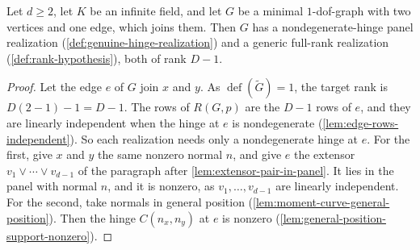\begin{lemma}
  \label{lem:theorem-55-base-producer-single}
  \leanok
  Let $d \ge 2$, let $K$ be an infinite field, and let $G$ be a minimal
  $1$-dof-graph with two vertices and one edge, which joins them. Then
  $G$ has a nondegenerate-hinge panel realization
  (\cref{def:genuine-hinge-realization}) and a generic full-rank
  realization (\cref{def:rank-hypothesis}), both of rank $D - 1$.
\end{lemma}
\begin{proof}
  \leanok
  Let the edge $e$ of $G$ join $x$ and $y$. As
  $\operatorname{def}(\tilde G) = 1$, the target rank is
  $D(2 - 1) - 1 = D - 1$. The rows of $R(G,p)$ are the $D - 1$ rows of
  $e$, and they are linearly independent when the hinge at $e$ is
  nondegenerate (\cref{lem:edge-rows-independent}). So each
  realization needs only a nondegenerate hinge at $e$. For the first,
  give $x$ and $y$ the same nonzero normal $n$, and give $e$ the extensor
  $v_1 \vee \cdots \vee v_{d-1}$ of the paragraph after
  \cref{lem:extensor-pair-in-panel}. It lies in the panel with normal $n$,
  and it is nonzero, as $v_1, \dots, v_{d-1}$ are linearly independent. For
  the second, take normals in general position
  (\cref{lem:moment-curve-general-position}). Then the hinge
  $C(n_x, n_y)$ at $e$ is nonzero
  (\cref{lem:general-position-support-nonzero}).
\end{proof}


